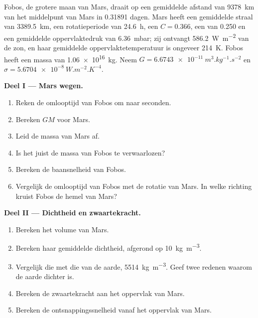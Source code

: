 \begin{problem}
\label{pb:b1:comparative-planetology:1}
Fobos, de grotere maan van Mars, draait op een gemiddelde afstand van \qty{9378}{km} van het middelpunt van Mars in
\num{0.31891} dagen. Mars heeft een gemiddelde straal van \qty{3389.5}{km}, een rotatieperiode van \qty{24.6}{h}, een
 $C = 0.366$, een  van 0.250 en een gemiddelde oppervlaktedruk van \qty{6.36}{mbar};
zij ontvangt \qty{586.2}{W.m^{-2}} van de zon, en haar gemiddelde oppervlaktetemperatuur is ongeveer \qty{214}{K}.
Fobos heeft een massa van \qty{1.06e16}{kg}. Neem $G = \qty{6.6743e-11}{m^3.kg^{-1}.s^{-2}}$ en
$\sigma = \qty{5.6704e-8}{W.m^{-2}.K^{-4}}$.

\medskip
\noindent\textbf{Deel I --- Mars wegen.}
\begin{enumerate}
  \item Reken de omlooptijd van Fobos om naar seconden.
  \item Bereken $GM$ voor Mars.
  \item Leid de massa van Mars af.
  \item Is het juist de massa van Fobos te verwaarlozen?
  \item Bereken de baansnelheid van Fobos.
  \item Vergelijk de omlooptijd van Fobos met de rotatie van Mars. In welke richting kruist Fobos de hemel van Mars?
\end{enumerate}

\medskip
\noindent\textbf{Deel II --- Dichtheid en zwaartekracht.}
\begin{enumerate}[resume]
  \item Bereken het volume van Mars.
  \item Bereken haar gemiddelde dichtheid, afgerond op \qty{10}{kg.m^{-3}}.
  \item Vergelijk die met die van de aarde, \qty{5514}{kg.m^{-3}}. Geef twee redenen waarom de aarde dichter is.
  \item Bereken de zwaartekracht aan het oppervlak van Mars.
  \item Bereken de ontsnappingssnelheid vanaf het oppervlak van Mars.
\end{enumerate}


\end{problem}
